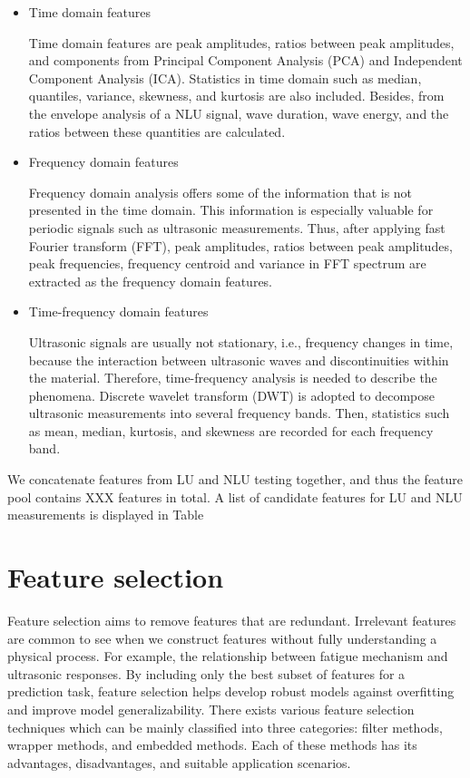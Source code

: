 \begin{itemize}
    \item Time domain features
    
    Time domain features are peak amplitudes, ratios between peak amplitudes, and components from Principal Component Analysis (PCA) and Independent Component Analysis (ICA). Statistics in time domain such as median, quantiles, variance, skewness, and kurtosis are also included. Besides, from the envelope analysis of a NLU signal, wave duration, wave energy, and the ratios between these quantities are calculated.

    \item Frequency domain features
    
    Frequency domain analysis offers some of the information that is not presented in the time domain. This information is especially valuable for periodic signals such as ultrasonic measurements. Thus, after applying fast Fourier transform (FFT), peak amplitudes, ratios between peak amplitudes, peak frequencies, frequency centroid and variance in FFT spectrum are extracted as the frequency domain features.

    \item Time-frequency domain features
    
    Ultrasonic signals are usually not stationary, i.e., frequency changes in time, because the interaction between ultrasonic waves and discontinuities within the material. Therefore, time-frequency analysis is needed to describe the phenomena. Discrete wavelet transform (DWT) is adopted to decompose ultrasonic measurements into several frequency bands. Then, statistics such as mean, median, kurtosis, and skewness are recorded for each frequency band.
\end{itemize}

We concatenate features from LU and NLU testing together, and thus the feature pool contains XXX features in total. A list of candidate features for LU and NLU measurements is displayed in Table

\section{Feature selection}
Feature selection aims to remove features that are redundant. Irrelevant features are common to see when we construct features without fully understanding a physical process. For example, the relationship between fatigue mechanism and ultrasonic responses. By including only the best subset of features for a prediction task, feature selection helps develop robust models against overfitting and improve model generalizability. There exists various feature selection techniques which can be mainly classified into three categories: filter methods, wrapper methods, and embedded methods. Each of these methods has its advantages, disadvantages, and suitable application scenarios.

